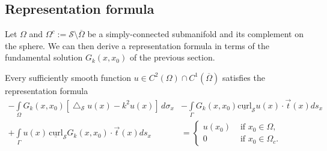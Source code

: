 \documentclass[final]{siamltex}
\newcommand{\lap}{\bigtriangleup}
\renewcommand{\S} {\mathcal{S}}
\begin{document}
\subsection{Representation formula}
\label{s:representation}
Let $\Omega$ and $\Omega^{c}:=\S\setminus{\overline{\Omega}}$ be a
simply-connected submanifold and its complement on the sphere. We can
then derive a representation formula in terms of the fundamental
solution
$G_k(x,x_{0})$ of the previous section.
\begin{proposition}
\label{prop:repr}
Every sufficiently smooth function $u \in C^{2}(\Omega) \cap
C^{1}(\overline{\Omega})$ satisfies the representation formula
\begin{align} 
\label{eq:representationformula}
 - \int\limits_{\Omega} 
    G_k(x,x_{0})\left[\lap_{\S}u(x) -k^2 u(x)\right]\,d\sigma_x 
 &- \int\limits_{{\Gamma}} G_k(x,x_{0})  
    \underline{\mbox{curl}}_{\S} u(x) \cdot \vec{t}(x) ds_x \nonumber \\
 + \int\limits_{{\Gamma}}  u(x)
 \,\underline{\mbox{curl}}_{{\S}} G_k(x,x_0) \cdot \vec{t}(x) ds_x 
 &= \left\{ \begin{array}{ll} u(x_0) & \mbox{ if $x_0\in \Omega$},\\
				0 & \mbox{ if  $x_0\in{\Omega}_c$}. 
  \end{array} \right.
\end{align}

\end{proposition}
\end{document}
